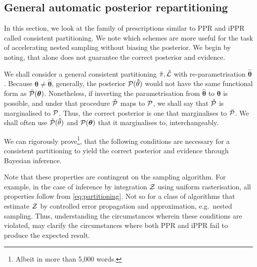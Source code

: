 \documentclass[usenatbib]{mnras}
\begin{document}
\subsection{General automatic posterior repartitioning}\label{sec:gapr}

In this section, we look at the family of prescriptions similar to PPR
and iPPR called consistent partitioning. We note which schemes are
more useful for the task of accelerating nested sampling without
biasing the posterior. We begin by noting, that 
alone does not guarantee the correct posterior and evidence.

We shall consider a general consistent partitioning
\(\hat{\pi}, \hat{\cal L}\) with re-parametrisation
\(\hat{\bm{\theta}}\). Because $\bm{\theta} \ne \hat{\bm{\theta}}$, generally, the
posterior \({\cal P}(\bm\hat{\theta})\) would not have the same
functional form as \(\bar{\cal P}(\bm{\theta})\). Nonetheless, if
inverting the parametrisation from $\bm{\hat{\theta}}$ to $\bm{\theta}$
is possible, and under that procedure $\hat{\cal P}$ maps to
${\cal P}$, we shall say that $\hat{\cal P}$ is marginalised to
${\cal P}$. Thus, the correct posterior is one that marginalises to
$\bar{\cal P}$. We shall often use $\hat{\cal P}(\bm\hat{\theta})$ and
${\cal P}(\bm{\theta})$ that it marginalises to, interchangeably.

We can rigorously prove\footnote{Albeit in more than 5,000 words.},
that the following conditions are necessary for a consistent
partitioning to yield the correct posterior and evidence through
Bayesian inference.
Note that these properties are contingent on the sampling
algorithm. For example, in the case of inference by integration
${\cal Z}$ using uniform rasterisation, all properties follow from
\cref{eq:partitioning}. Not so for a class of algorithms that estimate
${\cal Z}$ by controlled error propagation and approximation,
e.g.~nested sampling. Thus, understanding the circumstances wherein
these conditions are violated, may clarify the circumstances where
both PPR and iPPR fail to produce the expected result.
\end{document}
